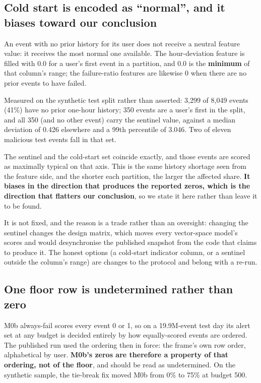 \documentclass[11pt,a4paper]{article}
\begin{document}
\subsection{Cold start is encoded as ``normal'', and it biases toward our conclusion}

An event with no prior history for its user does not receive a neutral feature
value: it receives the most normal one available. The hour-deviation feature is
filled with $0.0$ for a user's first event in a partition, and $0.0$ is the
\textbf{minimum} of that column's range; the failure-ratio features are likewise
0 when there are no prior events to have failed.

Measured on the synthetic test split rather than asserted: 3{,}299 of 8{,}049
events (41\%) have no prior one-hour history; 350 events are a user's first in
the split, and all 350 (and no other event) carry the sentinel value,
against a median deviation of 0.426 elsewhere and a 99th percentile of 3.046. Two
of eleven malicious test events fall in that set.

The sentinel and the cold-start set coincide exactly, and those events are scored
as maximally typical on that axis. This is the same history shortage seen from the
feature side, and the shorter each partition, the larger the affected share.
\textbf{It biases in the direction that produces the reported zeros, which is the
direction that flatters our conclusion}, so we state it here rather than leave it
to be found.

It is not fixed, and the reason is a trade rather than an oversight: changing the
sentinel changes the design matrix, which moves every vector-space model's scores
and would desynchronise the published snapshot from the code that claims to
produce it. The honest options (a cold-start indicator column, or a sentinel
outside the column's range) are changes to the protocol and belong with a
re-run.

\subsection{One floor row is undetermined rather than zero}

M0b always-fail scores every event 0 or 1, so on a 19.9M-event test day its alert
set at any budget is decided entirely by how equally-scored events are ordered.
The published run used the ordering then in force: the frame's own row order,
alphabetical by user. \textbf{M0b's zeros are therefore a property of that
ordering, not of the floor}, and should be read as undetermined. On the synthetic
sample, the tie-break fix moved M0b from 0\% to 75\% at budget 500.
\end{document}

